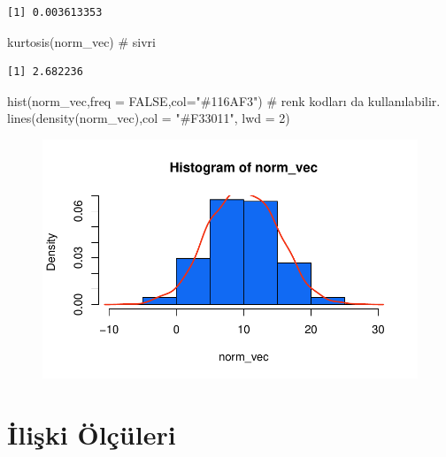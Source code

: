 \documentclass[
  letterpaper,
  DIV=11,
  numbers=noendperiod]{scrreprt}
\newenvironment{Shaded}{\begin{snugshade}}{\end{snugshade}}
\newcommand{\AttributeTok}[1]{\textcolor[rgb]{0.40,0.45,0.13}{#1}}
\newcommand{\CommentTok}[1]{\textcolor[rgb]{0.37,0.37,0.37}{#1}}
\newcommand{\ConstantTok}[1]{\textcolor[rgb]{0.56,0.35,0.01}{#1}}
\newcommand{\DecValTok}[1]{\textcolor[rgb]{0.68,0.00,0.00}{#1}}
\newcommand{\FunctionTok}[1]{\textcolor[rgb]{0.28,0.35,0.67}{#1}}
\newcommand{\NormalTok}[1]{\textcolor[rgb]{0.00,0.23,0.31}{#1}}
\newcommand{\StringTok}[1]{\textcolor[rgb]{0.13,0.47,0.30}{#1}}
\begin{document}
\begin{verbatim}
[1] 0.003613353
\end{verbatim}

\begin{Shaded}
\begin{Highlighting}[]
\FunctionTok{kurtosis}\NormalTok{(norm\_vec) }\CommentTok{\# sivri}
\end{Highlighting}
\end{Shaded}

\begin{verbatim}
[1] 2.682236
\end{verbatim}

\begin{Shaded}
\begin{Highlighting}[]
\FunctionTok{hist}\NormalTok{(norm\_vec,}\AttributeTok{freq =} \ConstantTok{FALSE}\NormalTok{,}\AttributeTok{col=}\StringTok{"\#116AF3"}\NormalTok{) }\CommentTok{\# renk kodları da kullanılabilir.}
\FunctionTok{lines}\NormalTok{(}\FunctionTok{density}\NormalTok{(norm\_vec),}\AttributeTok{col =} \StringTok{"\#F33011"}\NormalTok{, }\AttributeTok{lwd =} \DecValTok{2}\NormalTok{)}
\end{Highlighting}
\end{Shaded}

\begin{figure}[H]

{\centering \includegraphics{statistics_files/figure-pdf/unnamed-chunk-10-3.pdf}

}

\end{figure}

\hypertarget{iliux15fki-uxf6luxe7uxfcleri}{%
\section*{İlişki Ölçüleri}\label{iliux15fki-uxf6luxe7uxfcleri}}
\end{document}
